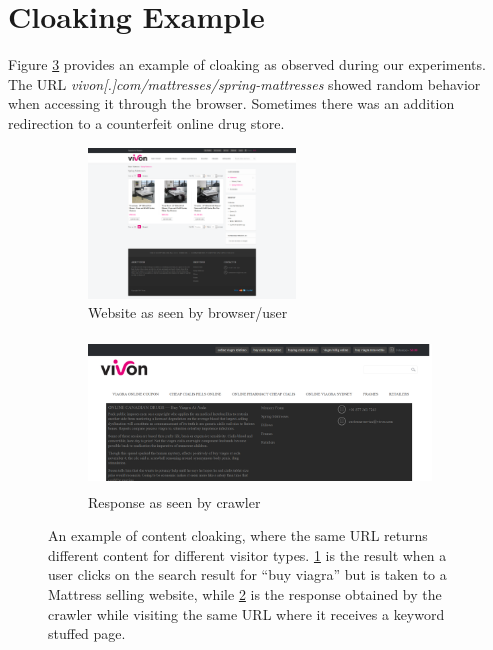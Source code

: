 \documentclass[letterpaper,twocolumn,10pt]{article}
\begin{document}
\appendixpage
\appendix
\section{Cloaking Example}
Figure \ref{fig:cloak_eg} provides an example of cloaking as observed during our experiments. The URL {\it vivon[.]com/mattresses/spring-mattresses} showed random behavior when accessing it through the browser. Sometimes there was an addition redirection to a counterfeit online drug store.
\begin{figure}[t]
  \begin{subfigure}{0.5\textwidth}
    \includegraphics[width=\textwidth, height=4cm]{./proj-org.png}
    \caption{Website as seen by browser/user}
    \label{fig:org}
  \end{subfigure}
  \begin{subfigure}{0.5\textwidth}
    \includegraphics[width=\textwidth,height=4cm]{./proj-cloak.png}
    \caption{Response as seen by crawler}
    \label{fig:cloak}
  \end{subfigure}
	\caption{An example of content cloaking, where the same URL returns different content for different visitor types. \ref{fig:org} is the result when a user clicks on the search result for ``buy viagra'' but is taken to a Mattress selling website, while \ref{fig:cloak} is the response obtained by the crawler while visiting the same URL where it receives a keyword stuffed page.}
    \label{fig:cloak_eg}
\end{figure}
\end{document}
